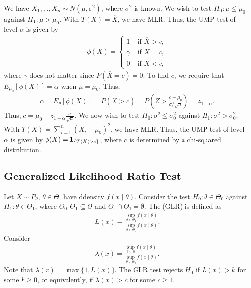 \begin{example}
    We have $X_{1},\ldots,X_{n} \sim N(\mu,\sigma^{2})$, where $\sigma^{2}$ is known. We wish to test $H_{0}:\mu \leq \mu_{0}$ against $H_{1}:\mu > \mu_{0}$. With $T(X) = \overline{X}$, we have MLR. Thus, the UMP test of level $\alpha$ is given by
    \begin{align}
        \phi(X) = \begin{cases}
            1 &\text{ if } \overline{X} > c,\\
            \gamma &\text{ if } \overline{X} = c,\\
            0 &\text{ if } \overline{X} < c,
        \end{cases}
    \end{align}
    where $\gamma$ does not matter since $P(\overline{X} = c) = 0$. To find $c$, we require that $E_{\mu_{0}}[\phi(X)] = \alpha$ when $\mu = \mu_{0}$. Thus,
    \begin{align}
        \alpha = E_{\theta}[\phi(X)] = P(\overline{X} > c) = P\left(Z > \frac{c - \mu_{0}}{\sigma/\sqrt{n}}\right) = z_{1-\alpha}.
    \end{align}
    Thus, $c = \mu_{0} + z_{1-\alpha} \frac{\sigma}{\sqrt{n}}$. We now wish to test $H_{0}:\sigma^{2} \leq \sigma_{0}^{2}$ against $H_{1}:\sigma^{2} > \sigma_{0}^{2}$. With $T(X) = \sum_{i=1}^{n}(X_{i} - \mu_{0})^{2}$, we have MLR. Thus, the UMP test of level $\alpha$ is given by $\phi(X) = \textbf{1}_{\{T(X) > c\}}$, where $c$ is determined by a chi-squared distribution.
\end{example}

\subsection{Generalized Likelihood Ratio Test}

Let $X \sim P_{\theta}$, $\theta \in \Theta$, have ddensity $f(x \mid \theta)$. Consider the test $H_{0}:\theta \in \Theta_{0}$ against $H_{1}:\theta \in \Theta_{1}$, where $\Theta_{0},\Theta_{1} \subseteq \Theta$ and $\Theta_{0} \cap \Theta_{1} = \emptyset$. The  (GLR) is defined as
\begin{align}
    L(x) = \frac{\sup_{\theta \in \Theta_{1}}f(x \mid \theta)}{\sup_{\theta \in \Theta_{0}}f(x \mid \theta)}.
\end{align}
Consider
\begin{align}
    \lambda(x) = \frac{\sup_{\theta \in \Theta}f(x \mid \theta)}{\sup_{\theta \in \Theta_{0}}f(x \mid \theta)}.
\end{align}
Note that $\lambda(x) = \max\{1, L(x)\}$. The GLR test rejects $H_{0}$ if $L(x) > k$ for some $k \geq 0$, or equivalently, if $\lambda(x) > c$ for some $c \geq 1$.

